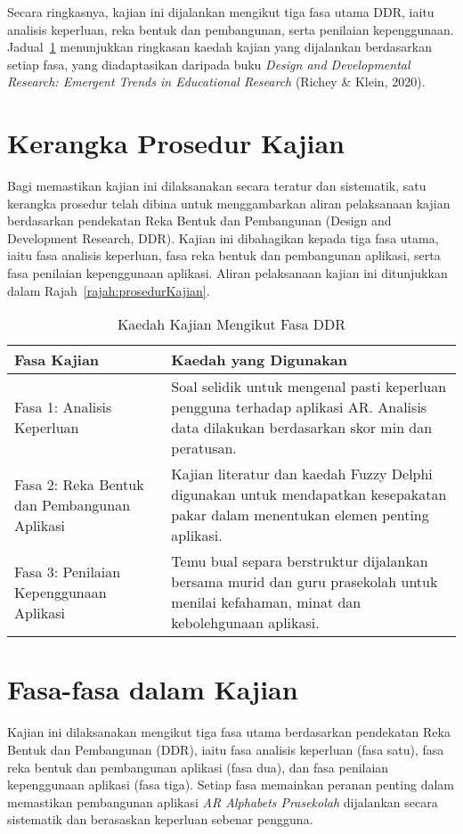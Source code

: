 Secara ringkasnya, kajian ini dijalankan mengikut tiga fasa utama DDR, iaitu analisis keperluan, reka bentuk dan pembangunan, serta penilaian kepenggunaan. Jadual~\ref{jadual:kaedahDDR} menunjukkan ringkasan kaedah kajian yang dijalankan berdasarkan setiap fasa, yang diadaptasikan daripada buku \textit{Design and Developmental Research: Emergent Trends in Educational Research} (Richey \& Klein, 2020).
\section{Kerangka Prosedur Kajian}

Bagi memastikan kajian ini dilaksanakan secara teratur dan sistematik, satu kerangka prosedur telah dibina untuk menggambarkan aliran pelaksanaan kajian berdasarkan pendekatan Reka Bentuk dan Pembangunan (Design and Development Research, DDR). Kajian ini dibahagikan kepada tiga fasa utama, iaitu fasa analisis keperluan, fasa reka bentuk dan pembangunan aplikasi, serta fasa penilaian kepenggunaan aplikasi. Aliran pelaksanaan kajian ini ditunjukkan dalam Rajah~\ref{rajah:prosedurKajian}.

\begin{table}[H]
\centering
\caption{Kaedah Kajian Mengikut Fasa DDR}
\label{jadual:kaedahDDR}
\begin{tabular}{|p{4cm}|p{10cm}|}
\hline
\textbf{Fasa Kajian} & \textbf{Kaedah yang Digunakan} \\
\hline
Fasa 1: Analisis Keperluan & Soal selidik untuk mengenal pasti keperluan pengguna terhadap aplikasi AR. Analisis data dilakukan berdasarkan skor min dan peratusan. \\
\hline
Fasa 2: Reka Bentuk dan Pembangunan Aplikasi & Kajian literatur dan kaedah Fuzzy Delphi digunakan untuk mendapatkan kesepakatan pakar dalam menentukan elemen penting aplikasi. \\
\hline
Fasa 3: Penilaian Kepenggunaan Aplikasi & Temu bual separa berstruktur dijalankan bersama murid dan guru prasekolah untuk menilai kefahaman, minat dan kebolehgunaan aplikasi. \\
\hline
\end{tabular}
\end{table}
\section{Fasa-fasa dalam Kajian}

Kajian ini dilaksanakan mengikut tiga fasa utama berdasarkan pendekatan Reka Bentuk dan Pembangunan (DDR), iaitu fasa analisis keperluan (fasa satu), fasa reka bentuk dan pembangunan aplikasi (fasa dua), dan fasa penilaian kepenggunaan aplikasi (fasa tiga). Setiap fasa memainkan peranan penting dalam memastikan pembangunan aplikasi \textit{AR Alphabets Prasekolah} dijalankan secara sistematik dan berasaskan keperluan sebenar pengguna.

